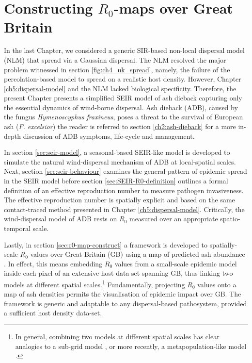 \chapter{Constructing $R_0$-maps over Great Britain}
\label{ch:6-adb}

In the last Chapter, we considered a generic SIR-based non-local dispersal model (NLM) that spread via a Gaussian dispersal. 
The NLM resolved the major problem witnessed in section \ref{fig:ch4_uk_spread}, 
namely, the failure of the percolation-based model to spread on a realistic host density. 
However, Chapter \ref{ch5:dispersal-model} and the NLM lacked biological specificity. 
Therefore, the present Chapter presents a simplified SEIR model of ash dieback capturing only the essential dynamics of wind-borne dispersal.
Ash dieback (ADB), caused by the fungus \textit{Hymenoscyphus fraxineus}, poses a threat to the survival of European ash (\textit{F. excelsior})\textemdash
the reader is referred to section \ref{ch2:ash-dieback} for a more in-depth discussion of ADB symptoms, life-cycle and management.

In section \ref{sec:seir-model}, a seasonal-based SEIR-like model is developed to simulate the natural wind-dispersal mechanism of ADB at local-spatial scales. 
Next, section \ref{sec:seir-behaviour} examines the general pattern of epidemic spread in the SEIR model before section \ref{sec:SEIR-R0-definition} 
outlines a formal definition of an effective reproduction number to measure pathogen invasiveness. 
The effective reproduction number is spatially explicit and based on the same contact-traced method presented in Chapter \ref{ch5:dispersal-model}.
Critically, the wind-dispersal model of ADB rests on $R_0$ measured over an appropriate spatio-temporal scale.

Lastly, in section \ref{sec:r0-map-construct} a framework is developed to spatially-scale $R_0$ values over Great Britain (GB) using a map of predicted ash abundance \cite{hill.data}. 
In effect, this means embedding $R_0$ values from a small-scale epidemic model inside each pixel of an extensive host data set spanning GB, 
thus linking two models at different spatial scales.\footnote{In general, combining two models at different spatial scales has clear analogies to a 
sub-grid model \cite{sub-grid}, or more recently, a metapopulation-like model \cite{GRENFELL1997395}.} 
Fundamentally, projecting $R_0$ values onto a map of ash densities permits the visualisation of epidemic impact over GB.
The framework is generic and adaptable to any dispersal-based pathosystem, provided a sufficient host density data-set.


